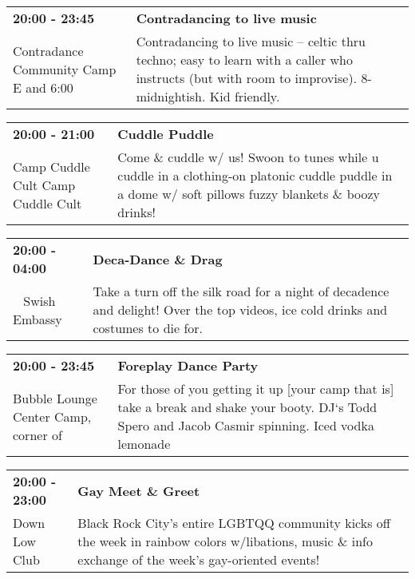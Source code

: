\begin{tabular}{ p{1in} p{2.2in} }
    \textbf{20:00 - 23:45} & \textbf{Contradancing to live music} \\
    Contradance Community Camp \newline E  and 6:00 & Contradancing to live music -- celtic thru techno; easy to learn with a caller who instructs (but with room to improvise). 8-midnightish. Kid friendly. \\
    \hline 
\end{tabular}
    
\begin{tabular}{ p{1in} p{2.2in} }
    \textbf{20:00 - 21:00} & \textbf{Cuddle Puddle} \\
    Camp Cuddle Cult \newline Camp Cuddle Cult & Come \& cuddle w/ us! Swoon to tunes while u cuddle in a clothing-on platonic cuddle puddle in a dome w/ soft pillows fuzzy blankets \& boozy drinks! \\
    \hline 
\end{tabular}
    
\begin{tabular}{ p{1in} p{2.2in} }
    \textbf{20:00 - 04:00} & \textbf{Deca-Dance \& Drag} \\
    ~ \newline Swish Embassy & Take a turn off the silk road for a night of decadence and delight! Over the top videos, ice cold drinks and costumes to die for. \\
    \hline 
\end{tabular}
    
\begin{tabular}{ p{1in} p{2.2in} }
    \textbf{20:00 - 23:45} & \textbf{Foreplay Dance Party} \\
    Bubble Lounge \newline Center Camp, corner of  & For those of you getting it up [your camp that is] take a break and shake your booty.   DJ`s Todd Spero and Jacob Casmir spinning. Iced vodka lemonade \\
    \hline 
\end{tabular}
    
\begin{tabular}{ p{1in} p{2.2in} }
    \textbf{20:00 - 23:00} & \textbf{Gay Meet \& Greet} \\
    Down Low Club \newline  & Black Rock City's entire LGBTQQ community kicks off the week in rainbow colors w/libations, music \& info exchange of the week's gay-oriented events! \\
    \hline 
\end{tabular}
    
